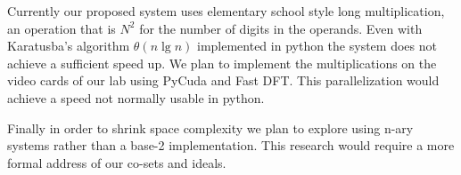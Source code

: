 \documentclass[letterpaper,11pt]{article} %
\begin{document}
\hspace{1em}Currently our proposed system uses elementary school style long multiplication, an operation that is \(N^2\) for the number of digits in the operands. Even with Karatusba's algorithm \(\theta( n \lg n)\) implemented in python the system does not achieve a sufficient speed up. We plan to implement the multiplications on the video cards of our lab using PyCuda and Fast DFT. This parallelization would achieve a speed not normally usable in python.


\hspace{1em}Finally in order to shrink space complexity we plan to explore using n-ary systems rather than a base-2 implementation. This research would require a more formal address of our co-sets and ideals.
\end{document}
